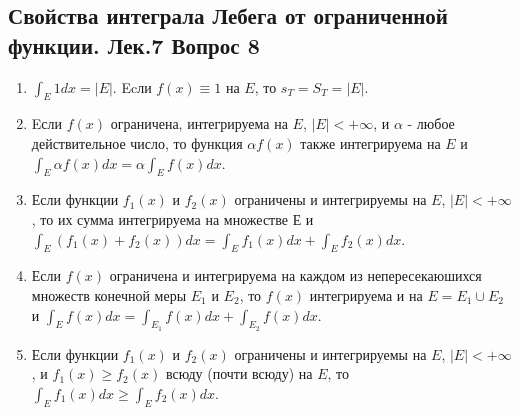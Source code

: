 \documentclass{article}
\begin{document}
\subsection{Свойства интеграла Лебега от ограниченной функции. Лек.7 \textbf{Вопрос 8}}
	\begin{enumerate}
	\item  $\int_{E} 1 d x=|E|$. Ecли $f(x) \equiv 1$ на $E$, то $s_{T}=S_{T}=|E|$. 
	\item Eсли $f(x)$ ограничена, интегрируема на $E$, $|E|<+\infty$, и $\alpha$ - любое действительное число, то функция $\alpha f(x)$ также интегрируема на $E$ и $\int_{E} \alpha f(x)dx=\alpha \int_{E} f(x)dx$. 
	\item Если функции $f_{1}(x)$ и $f_{2}(x)$ ограничены и интегрируемы на $E$, $|E|<+\infty$, то их сумма интегрируема на множестве $Е$ и $\int_{E}\left(f_{1}(x)+f_{2}(x)\right)dx=\int_{E} f_{1}(x) d x+\int_{E} f_{2}(x)dx$.
	\item Если $f(x)$ ограничена и интегрируема на каждом из непересекаюшихся множеств конечной меры $E_{1}$ и $E_{2}$, то $f(x)$ интегрируема и на  $E=E_{1} \cup E_{2}$  и  $\int_{E} f(x)dx=\int_{E_{1}} f(x)dx+\int_{E_{2}} f(x)dx$.
	\item Если функции $f_{1}(x)$ и $f_{2}(x)$ ограничены и интегрируемы на $E$, $|E|<+\infty$, и $f_{1}(x) \geq f_{2}(x)$ всюду (почти всюду) на $E$, то $\int_{E} f_{1}(x)dx \geq \int_{E} f_{2}(x)dx$.
	\end{enumerate}
\end{document}
